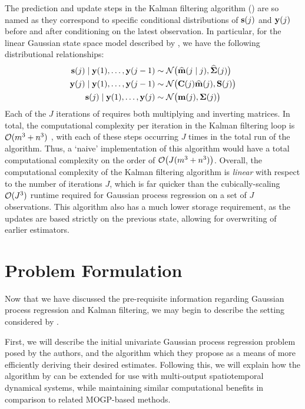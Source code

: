 \documentclass[10pt]{article}
\numberwithin{equation}{section}
\begin{document}
The prediction and update steps in the Kalman filtering algorithm () are so named as they correspond to specific conditional distributions of $\mathbf{s}(j)$ and $\mathbf{y}(j)$ before and after conditioning on the latest observation. In particular, for the linear Gaussian state space model described by , we have the following distributional relationships:
\begin{subequations}
    \label{eq:Kalman-conditionals}
    \begin{align}
        \bfs(j) \mid \bfy(1), \dots, \bfy(j-1) &\sim \calN\big(\widehat{\bfm}(j\mid j), \widehat{\bfSigma}(j)\big) \\%
        \bfy(j) \mid \bfy(1), \dots, \bfy(j-1) &\sim \calN\big(\bfC(j)\widehat{\bfm}(j), \bfS(j)\big) \\%
        \bfs(j) \mid \bfy(1), \dots, \bfy(j) &\sim \calN\big(\bfm(j), \bfSigma(j)\big)
    \end{align}
\end{subequations}
Each of the $J$ iterations of  requires both multiplying and inverting matrices.  In total, the computational complexity per iteration in the Kalman filtering loop is $\mathcal{O}(m^{3} + n^{3})$ \citep{Kalman-Complexity-2019}, with each of these steps occurring $J$ times in the total run of the algorithm. Thus, a `naive' implementation of this algorithm would have a total computational complexity on the order of $\mathcal{O}\big(J(m^{3} + n^{3})\big)$. Overall, the computational complexity of the Kalman filtering algorithm is \emph{linear} with respect to the number of iterations $J$, which is far quicker than the cubically-scaling $\mathcal{O}(J^3)$ runtime required for Gaussian process regression on a set of $J$ observations. This algorithm also has a much lower storage requirement, as the updates are based strictly on the previous state, allowing for overwriting of earlier estimators.

\section{Problem Formulation}
\label{sec:problem}
Now that we have discussed the pre-requisite information regarding Gaussian process regression and Kalman filtering, we may begin to describe the setting considered by \citeauthor{Todescato-Efficient-2020}.

First, we will describe the initial univariate Gaussian process regression problem posed by the authors, and the algorithm which they propose as a means of more efficiently deriving their desired estimates. Following this, we will explain how the algorithm by \citeauthor{Todescato-Efficient-2020} can be extended for use with multi-output spatiotemporal dynamical systems, while maintaining similar computational benefits in comparison to related MOGP-based methods.
\end{document}
